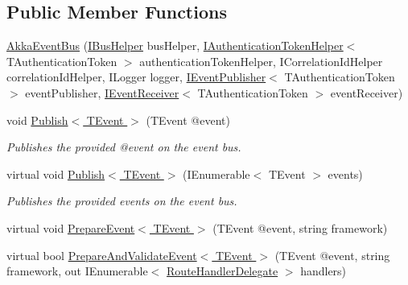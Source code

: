 \subsection*{Public Member Functions}
\begin{DoxyCompactItemize}
\item 
\hyperlink{classCqrs_1_1Akka_1_1Events_1_1AkkaEventBus_ab1f292c21b5516a89fdcc019deb04063_ab1f292c21b5516a89fdcc019deb04063}{Akka\+Event\+Bus} (\hyperlink{interfaceCqrs_1_1Bus_1_1IBusHelper}{I\+Bus\+Helper} bus\+Helper, \hyperlink{interfaceCqrs_1_1Authentication_1_1IAuthenticationTokenHelper}{I\+Authentication\+Token\+Helper}$<$ T\+Authentication\+Token $>$ authentication\+Token\+Helper, I\+Correlation\+Id\+Helper correlation\+Id\+Helper, I\+Logger logger, \hyperlink{interfaceCqrs_1_1Events_1_1IEventPublisher}{I\+Event\+Publisher}$<$ T\+Authentication\+Token $>$ event\+Publisher, \hyperlink{interfaceCqrs_1_1Events_1_1IEventReceiver}{I\+Event\+Receiver}$<$ T\+Authentication\+Token $>$ event\+Receiver)
\item 
void \hyperlink{classCqrs_1_1Akka_1_1Events_1_1AkkaEventBus_aaba5d37020e21d03cc2bbc3da14f45ea_aaba5d37020e21d03cc2bbc3da14f45ea}{Publish$<$ T\+Event $>$} (T\+Event @event)
\begin{DoxyCompactList}\small\item\em Publishes the provided {\itshape @event}  on the event bus. \end{DoxyCompactList}\item 
virtual void \hyperlink{classCqrs_1_1Akka_1_1Events_1_1AkkaEventBus_ad5b996dd77efbf51a2b5a32f94417772_ad5b996dd77efbf51a2b5a32f94417772}{Publish$<$ T\+Event $>$} (I\+Enumerable$<$ T\+Event $>$ events)
\begin{DoxyCompactList}\small\item\em Publishes the provided {\itshape events}  on the event bus. \end{DoxyCompactList}\item 
virtual void \hyperlink{classCqrs_1_1Akka_1_1Events_1_1AkkaEventBus_ae9d248ec73204a7909c04e5a87bfeefb_ae9d248ec73204a7909c04e5a87bfeefb}{Prepare\+Event$<$ T\+Event $>$} (T\+Event @event, string framework)
\item 
virtual bool \hyperlink{classCqrs_1_1Akka_1_1Events_1_1AkkaEventBus_a1a89590afc6970f00fe055961a6773e8_a1a89590afc6970f00fe055961a6773e8}{Prepare\+And\+Validate\+Event$<$ T\+Event $>$} (T\+Event @event, string framework, out I\+Enumerable$<$ \hyperlink{classCqrs_1_1Bus_1_1RouteHandlerDelegate}{Route\+Handler\+Delegate} $>$ handlers)
\item 

\end{DoxyCompactItemize}
